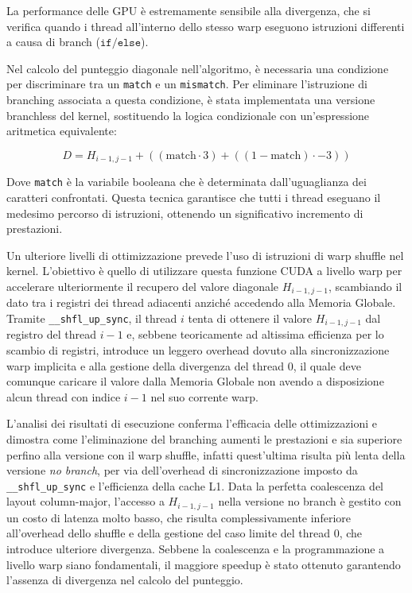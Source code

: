 \documentclass[a4paper,12pt]{article}
\begin{document}
La performance delle GPU è estremamente sensibile alla divergenza, che si verifica quando i thread all'interno dello stesso warp eseguono istruzioni differenti a causa di branch ($\texttt{if/else}$).

Nel calcolo del punteggio diagonale nell'algoritmo, è necessaria una condizione per discriminare tra un \texttt{match} e un \texttt{mismatch}.
Per eliminare l'istruzione di branching associata a questa condizione, è stata implementata una versione branchless del kernel, sostituendo la logica condizionale con un'espressione aritmetica equivalente:

$$
D = H_{i-1, j-1} + \left( (\text{match} \cdot 3) + ((1 - \text{match}) \cdot -3) \right)
$$

Dove \texttt{match} è la variabile booleana che è determinata dall'uguaglianza dei caratteri confrontati. Questa tecnica garantisce che tutti i thread eseguano il medesimo percorso di istruzioni, ottenendo un significativo incremento di prestazioni.

Un ulteriore livelli di ottimizzazione prevede l'uso di istruzioni di warp shuffle nel kernel. L'obiettivo è quello di utilizzare questa funzione CUDA a livello warp per accelerare ulteriormente il recupero del valore diagonale $H_{i-1, j-1}$, scambiando il dato tra i registri dei thread adiacenti anziché accedendo alla Memoria Globale.
Tramite \texttt{\_\_shfl\_up\_sync}, il thread $i$ tenta di ottenere il valore $H_{i-1, j-1}$ dal registro del thread $i-1$ e, sebbene teoricamente ad altissima efficienza per lo scambio di registri, introduce un leggero overhead dovuto alla sincronizzazione warp implicita e alla gestione della divergenza del thread 0, il quale deve comunque caricare il valore dalla Memoria Globale non avendo a disposizione alcun thread con indice $i-1$ nel suo corrente warp.

L'analisi dei risultati di esecuzione conferma l'efficacia delle ottimizzazioni e dimostra come l'eliminazione del branching aumenti le prestazioni e sia superiore perfino alla versione con il warp shuffle, infatti quest'ultima risulta più lenta della versione \textit{no branch}, per via dell'overhead di sincronizzazione imposto da \texttt{\_\_shfl\_up\_sync} e l'efficienza della cache L1. Data la perfetta coalescenza del layout column-major, l'accesso a $H_{i-1, j-1}$ nella versione no branch è gestito con un costo di latenza molto basso, che risulta complessivamente inferiore all'overhead dello shuffle e della gestione del caso limite del thread 0, che introduce ulteriore divergenza.
Sebbene la coalescenza e la programmazione a livello warp siano fondamentali, il maggiore speedup è stato ottenuto garantendo l'assenza di divergenza nel calcolo del punteggio.
\end{document}
